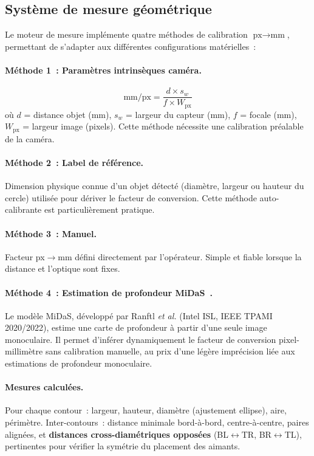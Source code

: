 \documentclass[12pt,a4paper]{report}
\begin{document}
\subsection{Syst\`eme de mesure g\'eom\'etrique}

Le moteur de mesure impl\'emente quatre m\'ethodes de calibration $\text{px} \rightarrow \text{mm}$, permettant de s'adapter aux diff\'erentes configurations mat\'erielles~:

\paragraph{M\'ethode 1~: Param\`etres intrins\`eques cam\'era.}
\[
    \text{mm/px} = \frac{d \times s_w}{f \times W_\text{px}}
\]
o\`u $d$ = distance objet (mm), $s_w$ = largeur du capteur (mm), $f$ = focale (mm), $W_\text{px}$ = largeur image (pixels). Cette m\'ethode n\'ecessite une calibration pr\'ealable de la cam\'era.

\paragraph{M\'ethode 2~: Label de r\'ef\'erence.}
Dimension physique connue d'un objet d\'etect\'e (diam\`etre, largeur ou hauteur du cercle) utilis\'ee pour d\'eriver le facteur de conversion. Cette m\'ethode auto-calibrante est particuli\`erement pratique.

\paragraph{M\'ethode 3~: Manuel.}
Facteur px$\to$mm d\'efini directement par l'op\'erateur. Simple et fiable lorsque la distance et l'optique sont fixes.

\paragraph{M\'ethode 4~: Estimation de profondeur MiDaS~\cite{ranftl2020midas}.}
Le mod\`ele MiDaS, d\'evelopp\'e par Ranftl \textit{et al.} (Intel ISL, IEEE TPAMI 2020/2022), estime une carte de profondeur \`a partir d'une seule image monoculaire. Il permet d'inf\'erer dynamiquement le facteur de conversion pixel-millim\`etre sans calibration manuelle, au prix d'une l\'eg\`ere impr\'ecision li\'ee aux estimations de profondeur monoculaire.

\paragraph{Mesures calcul\'ees.}
Pour chaque contour~: largeur, hauteur, diam\`etre (ajustement ellipse), aire, p\'erim\`etre.
Inter-contours~: distance minimale bord-\`a-bord, centre-\`a-centre, paires align\'ees, et \textbf{distances cross-diam\'etriques oppos\'ees} (BL$\leftrightarrow$TR, BR$\leftrightarrow$TL), pertinentes pour v\'erifier la sym\'etrie du placement des aimants.
\end{document}
